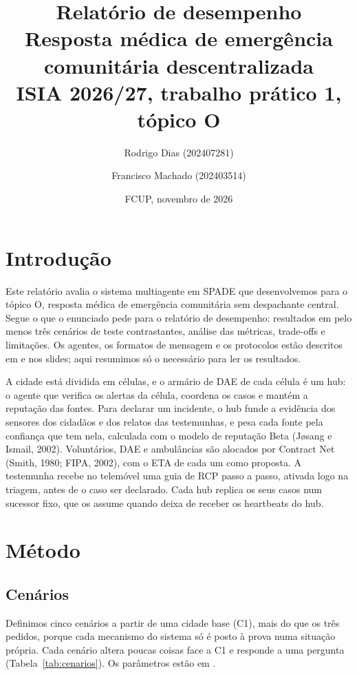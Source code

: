 \documentclass[11pt,a4paper]{article}
\title{Relatório de desempenho\\[0.4em]\large Resposta médica de emergência comunitária descentralizada\\ISIA 2026/27, trabalho prático 1, tópico O}
\author{Rodrigo Dias (202407281) \and Francisco Machado (202403514)}
\date{FCUP, novembro de 2026}
\begin{document}
\maketitle

\section{Introdução}

Este relatório avalia o sistema multiagente em SPADE que desenvolvemos para o tópico O, resposta médica de emergência comunitária sem despachante central. Segue o que o enunciado pede para o relatório de desempenho: resultados em pelo menos três cenários de teste contrastantes, análise das métricas, trade-offs e limitações. Os agentes, os formatos de mensagem e os protocolos estão descritos em  e nos slides; aqui resumimos só o necessário para ler os resultados.

A cidade está dividida em células, e o armário de DAE de cada célula é um hub: o agente que verifica os alertas da célula, coordena os casos e mantém a reputação das fontes. Para declarar um incidente, o hub funde a evidência dos sensores dos cidadãos e dos relatos das testemunhas, e pesa cada fonte pela confiança que tem nela, calculada com o modelo de reputação Beta (Jøsang e Ismail, 2002). Voluntários, DAE e ambulâncias são alocados por Contract Net (Smith, 1980; FIPA, 2002), com o ETA de cada um como proposta. A testemunha recebe no telemóvel uma guia de RCP passo a passo, ativada logo na triagem, antes de o caso ser declarado. Cada hub replica os seus casos num sucessor fixo, que os assume quando deixa de receber os heartbeats do hub.

\section{Método}

\subsection{Cenários}

Definimos cinco cenários a partir de uma cidade base (C1), mais do que os três pedidos, porque cada mecanismo do sistema só é posto à prova numa situação própria. Cada cenário altera poucas coisas face a C1 e responde a uma pergunta (Tabela~\ref{tab:cenarios}). Os parâmetros estão em .
\end{document}
